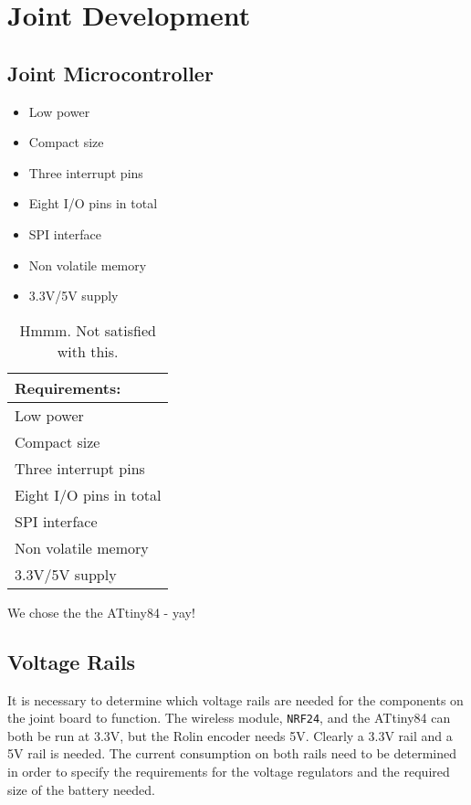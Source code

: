 \section{Joint Development}
\label{sec:joint_development}


\subsection{Joint Microcontroller}
\label{sub:joint_microcontroller}


\begin{itemize}
	\item Low power
	\item Compact size
	\item Three interrupt pins
	\item Eight I/O pins in total 
	\item SPI interface
	\item Non volatile memory
	\item 3.3V/5V supply
\end{itemize}


\begin{table}
	\centering
	\begin{tabular}{l}
		 \textbf{Requirements:} \\ \hline
		 Low power \\ \hline
		 Compact size \\ \hline
		 Three interrupt pins \\ \hline
		 Eight I/O pins in total\\ \hline
		 SPI interface \\ \hline
		 Non volatile memory \\ \hline
		 3.3V/5V supply \\ \hline
	\end{tabular}
	\caption{Hmmm. Not satisfied with this.}
	\label{tab:joint_mic_rec}
\end{table}

We chose the the ATtiny84 - yay!


\subsection{Voltage Rails}
\label{sub:voltage_rail}
It is necessary to determine which voltage rails are needed for the components on the joint board to function.
The wireless module, \texttt{NRF24}, and the ATtiny84 can both be run at 3.3V, but the Rolin encoder needs 5V.
Clearly a 3.3V rail and a 5V rail is needed. 
The current consumption on both rails need to be determined in order to specify the requirements for the voltage regulators and the required size of the battery needed.


